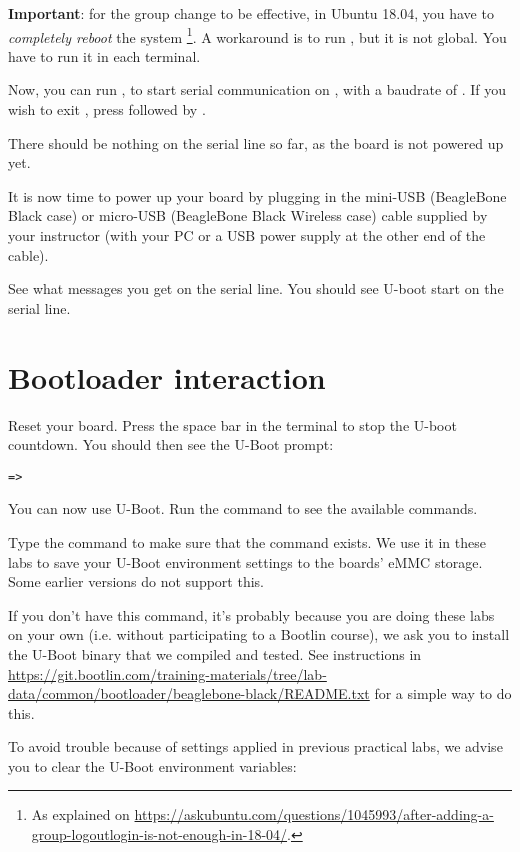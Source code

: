 {\bf Important}: for the group change to be effective, in Ubuntu 18.04, you have to
{\em completely reboot} the system \footnote{As explained on
\url{https://askubuntu.com/questions/1045993/after-adding-a-group-logoutlogin-is-not-enough-in-18-04/}.}.
A workaround is to run , but it is not global.
You have to run it in each terminal.

Now, you can run , to start serial
communication on , with a baudrate of . If
you wish to exit , press \code{[Ctrl][a]} followed by
\code{[Ctrl][x]}.

There should be nothing on the serial line so far, as the board is not
powered up yet.

It is now time to power up your board by plugging in the mini-USB
(BeagleBone Black case) or micro-USB (BeagleBone Black Wireless case)
cable supplied by your instructor (with your PC or a USB power supply at the
other end of the cable).

See what messages you get on the serial line. You should see U-boot
start on the serial line.

\section{Bootloader interaction}

Reset your board. Press the space bar in the  terminal
to stop the U-boot countdown. You should then see the U-Boot prompt:

\begin{verbatim}
=>
\end{verbatim}

You can now use U-Boot. Run the  command to see the available
commands.

Type the  command to make sure that the
 command exists. We use it in these labs to
save your U-Boot environment settings to the boards' eMMC storage.
Some earlier versions do not support this.

If you don't have this command, it's probably because you are doing these labs on your own
(i.e. without participating to a Bootlin course), we ask you to install the U-Boot binary
that we compiled and tested. See instructions in
\url{https://git.bootlin.com/training-materials/tree/lab-data/common/bootloader/beaglebone-black/README.txt}
for a simple way to do this.

To avoid trouble because of settings applied in previous practical labs,
we advise you to clear the U-Boot environment variables:

